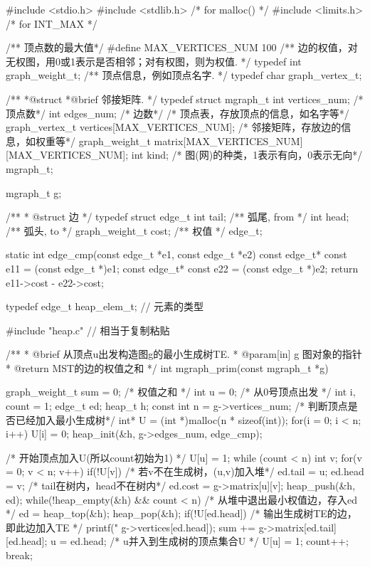 \begin{Codex}[label=mgraph_prim2.c]
#include <stdio.h>
#include <stdlib.h>  /* for malloc() */
#include <limits.h>  /* for INT_MAX */

/** 顶点数的最大值*/
#define MAX_VERTICES_NUM 100
/** 边的权值，对无权图，用0或1表示是否相邻；对有权图，则为权值. */
typedef int graph_weight_t;
/** 顶点信息，例如顶点名字. */
typedef char graph_vertex_t;

/**
 *@struct
 *@brief 邻接矩阵.
 */
typedef struct mgraph_t {
    int vertices_num; /* 顶点数*/
    int edges_num; /* 边数*/
    /* 顶点表，存放顶点的信息，如名字等*/
    graph_vertex_t vertices[MAX_VERTICES_NUM];
    /* 邻接矩阵，存放边的信息，如权重等*/
    graph_weight_t matrix[MAX_VERTICES_NUM][MAX_VERTICES_NUM];
    int kind; /* 图(网)的种类，1表示有向，0表示无向*/
} mgraph_t;

mgraph_t g;


/**
 * @struct 边
 */
typedef struct edge_t{
    int tail;  /** 弧尾, from */
    int head;  /** 弧头, to */
    graph_weight_t cost;  /** 权值 */
}edge_t;

static int edge_cmp(const edge_t *e1, const edge_t *e2) {
    const edge_t* const e11 = (const edge_t *)e1;
    const edge_t* const e22 = (const edge_t *)e2;
    return e11->cost - e22->cost;
}

typedef edge_t heap_elem_t; // 元素的类型

#include "heap.c"  // 相当于复制粘贴


/**
  * @brief 从顶点u出发构造图g的最小生成树TE.
  * @param[in] g 图对象的指针
  * @return MST的边的权值之和
  */
int mgraph_prim(const mgraph_t *g){
    graph_weight_t sum = 0; /* 权值之和 */
    int u = 0; /* 从0号顶点出发 */
    int i, count = 1;
    edge_t ed;
    heap_t h;
    const int n = g->vertices_num;
    /* 判断顶点是否已经加入最小生成树*/
    int* U = (int *)malloc(n * sizeof(int));
    for(i = 0; i < n; i++) U[i] = 0;
    heap_init(&h, g->edges_num, edge_cmp);

    /* 开始顶点加入U(所以count初始为1) */
    U[u] = 1;
    while (count < n) {
        int v;
        for(v = 0; v < n; v++) if(!U[v]) { /* 若v不在生成树，(u,v)加入堆*/
            ed.tail = u;
            ed.head = v;
            /* tail在树内，head不在树内*/
            ed.cost = g->matrix[u][v];
            heap_push(&h, ed);
        }
        while(!heap_empty(&h) && count < n) {
            /* 从堆中退出最小权值边，存入ed */
            ed = heap_top(&h); heap_pop(&h);
            if(!U[ed.head]) {
                /* 输出生成树TE的边，即此边加入TE */
                printf("%
                        g->vertices[ed.head]);
                sum += g->matrix[ed.tail][ed.head];
                u = ed.head;
                /* u并入到生成树的顶点集合U */
                U[u] = 1;
                count++;
                break;
            }
        }
    }

}
\end{Codex}
